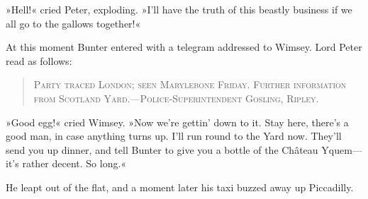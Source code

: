 »Hell!« cried Peter, exploding. »I'll have the truth of this beastly business if we all go to the gallows together!«

At this moment Bunter entered with a telegram addressed to Wimsey. Lord Peter read as follows:

\begin{quote}

\textsc{Party traced London; seen Marylebone Friday. Further information from Scotland Yard.---Police-Superintendent Gosling, Ripley.}

\end{quote}

»Good egg!« cried Wimsey. »Now we're gettin' down to it. Stay here, there's a good man, in case anything turns up. I'll run round to the Yard now. They'll send you up dinner, and tell Bunter to give you a bottle of the Château Yquem\allowbreak---\allowbreak it's rather decent. So long.«

He leapt out of the flat, and a moment later his taxi buzzed away up Piccadilly.

